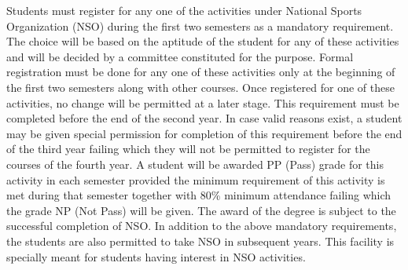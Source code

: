 Students must register for any one of the activities under National Sports Organization (NSO) during the first two semesters as a mandatory requirement. The choice will be based on the aptitude of the student for any of these activities and will be decided by a committee constituted for the purpose. Formal registration must be done for any one of these activities only at the beginning of the first two semesters along with other courses. Once registered for one of these activities, no change will be permitted at a later stage. This requirement must be completed before the end of the second year. In case valid reasons exist, a student may be given special permission for completion of this requirement before the end of the third year failing which they will not be permitted to register for the courses of the fourth year. A student will be awarded PP (Pass) grade for this activity in each semester provided the minimum requirement of this activity is met during that semester together with 80\% minimum attendance failing which the grade NP (Not Pass) will be given. The award of the degree is subject to the successful completion of NSO. In addition to the above mandatory requirements, the students are also permitted to take NSO in subsequent years. This facility is specially meant for students having interest in NSO activities.
